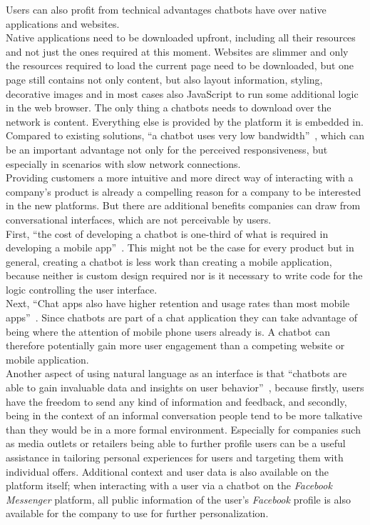 Users can also profit from technical advantages chatbots have over native applications and websites.
\\
Native applications need to be downloaded upfront, including all their resources and not just the ones required at this moment.
Websites are slimmer and only the resources required to load the current page need to be downloaded,
but one page still contains not only content, but also layout information, styling, decorative images and in most cases also JavaScript to run some additional logic in the web browser.
The only thing a chatbots needs to download over the network is content.
Everything else is provided by the platform it is embedded in.
Compared to existing solutions, ``a chatbot uses very low bandwidth''~\cite{techinasia}, which can be an important advantage not only for the perceived responsiveness, but especially in scenarios with slow network connections.
\\

Providing customers a more intuitive and more direct way of interacting with a company's product is already a compelling reason for a company to be interested in the new platforms. But there are additional benefits companies can draw from conversational interfaces, which are not perceivable by users.
\\

First, ``the cost of developing a chatbot is one-third of what is required in developing a mobile app''~\cite{techinasia}.
This might not be the case for every product but in general, creating a chatbot is less work than creating a mobile application, because neither is custom design required nor is it necessary to write code for the logic controlling the user interface.
\\

Next, ``Chat apps also have higher retention and usage rates than most mobile apps''~\cite{businessinsider}.
Since chatbots are part of a chat application they can take advantage of being where the attention of mobile phone users already is.
A chatbot can therefore potentially gain more user engagement than a competing website or mobile application.
\\

Another aspect of using natural language as an interface is that ``chatbots are able to gain invaluable data and insights on user behavior''~\cite{drum},
because firstly, users have the freedom to send any kind of information and feedback, and
secondly, being in the context of an informal conversation people tend to be more talkative than they would be in a more formal environment.
Especially for companies such as media outlets or retailers being able to further profile users can be a useful assistance in tailoring personal experiences for users and targeting them with individual offers.
Additional context and user data is also available on the platform itself;
when interacting with a user via a chatbot on the \emph{Facebook Messenger} platform, all public information of the user's \emph{Facebook} profile is also available for the company to use for further personalization.
\\

